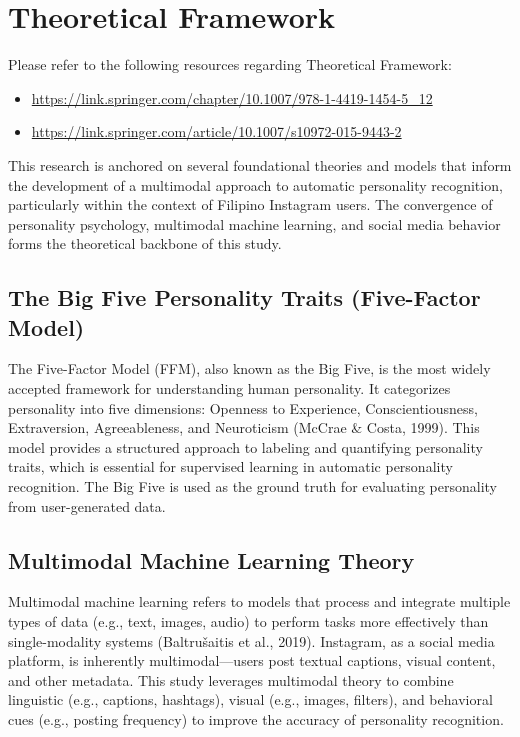 %
%
%                 

\chapter{Theoretical Framework}
\label{sec:theoframework}
Please refer to the following resources regarding Theoretical Framework: 

\begin{itemize}

\item \url{https://link.springer.com/chapter/10.1007/978-1-4419-1454-5_12}
\item \url{https://link.springer.com/article/10.1007/s10972-015-9443-2}



\end{itemize}
This research is anchored on several foundational theories and models that inform the development of a multimodal approach to automatic personality recognition, particularly within the context of Filipino Instagram users. The convergence of personality psychology, multimodal machine learning, and social media behavior forms the theoretical backbone of this study.

\section{The Big Five Personality Traits (Five-Factor Model)}
The Five-Factor Model (FFM), also known as the Big Five, is the most widely accepted framework for understanding human personality. It categorizes personality into five dimensions: Openness to Experience, Conscientiousness, Extraversion, Agreeableness, and Neuroticism (McCrae \& Costa, 1999). This model provides a structured approach to labeling and quantifying personality traits, which is essential for supervised learning in automatic personality recognition. The Big Five is used as the ground truth for evaluating personality from user-generated data.

\section{Multimodal Machine Learning Theory}
Multimodal machine learning refers to models that process and integrate multiple types of data (e.g., text, images, audio) to perform tasks more effectively than single-modality systems (Baltrušaitis et al., 2019). Instagram, as a social media platform, is inherently multimodal—users post textual captions, visual content, and other metadata. This study leverages multimodal theory to combine linguistic (e.g., captions, hashtags), visual (e.g., images, filters), and behavioral cues (e.g., posting frequency) to improve the accuracy of personality recognition.

